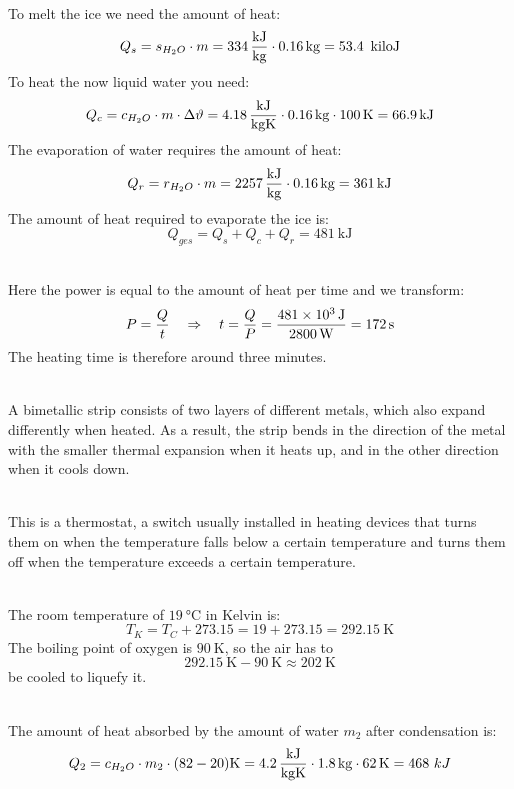 \documentclass[a4paper]{article}
\begin{document}
	\\
	To melt the ice we need the amount of heat:
	$$Q_s = s_{H_2O}\cdot m = \SI{334}{\kilo\joule\over \kilogram} \cdot \SI{0.16}{\kilogram} = \SI{53.4}{\ kilo\joule}$$
	To heat the now liquid water you need:
	$$Q_c = c_{H_2O}\cdot m \cdot \Delta \vartheta = \SI{4.18}{\kilo\joule\over \kilogram\kelvin}\cdot \SI{0.16}{\kilogram} \cdot \SI{100}{\kelvin}= \SI{66.9}{\kilo\joule}$$
	The evaporation of water requires the amount of heat:
	$$Q_r = r_{H_2O}\cdot m = \SI{2257}{\kilo\joule\over \kilogram}\cdot \SI{0.16}{\kilogram} = \SI{361}{\kilo\joule}$$
	The amount of heat required to evaporate the ice is:
	$$Q_{ges}=Q_s + Q_c + Q_r = \SI{481}{\kilo\joule}$$
	\vspace{0.5 cm}
	
	\\
	Here the power is equal to the amount of heat per time and we transform:
	$$ P = {Q \over t} \quad \Rightarrow \quad t = {Q \over P} = {\SI{481e3}{\joule}\over \SI{2800}{\watt}}=\SI {172}{\second} $$
	The heating time is therefore around three minutes.
	\vspace{0.5 cm}
	
	\\
	A bimetallic strip consists of two layers of different metals, which also expand differently when heated. As a result, the strip bends in the direction of the metal with the smaller thermal expansion when it heats up, and in the other direction when it cools down.
	\vspace{0.5 cm}
	
	\\
	This is a thermostat, a switch usually installed in heating devices that turns them on when the temperature falls below a certain temperature and turns them off when the temperature exceeds a certain temperature.
	\vspace{0.5 cm}
	
	\\
	The room temperature of $\SI{19}{\celsius}$ in Kelvin is:
	$$T_K = T_C + 273.15 = 19 + 273.15 = \SI{292.15}{\kelvin} $$
	The boiling point of oxygen is $\SI{90}{\kelvin}$, so the air has to
	$$\SI{292,15}{\kelvin}- \SI{90}{\kelvin} \approx \SI{202}{\kelvin}$$
	be cooled to liquefy it.
	\vspace{0.5 cm}
	
	\\
	The amount of heat absorbed by the amount of water $m_2$ after condensation is:
	$$Q_2=c_{H_2O}\cdot m_2 \cdot (82-20)\SI{}{\kelvin} = \SI{4,2}{\kilo\joule\over \kilogram\kelvin}\cdot \SI {1.8}{\kilogram} \cdot \SI{62}{\kelvin} = 468~kJ$$
	\vspace{0.5 cm}
	
\end{document}
